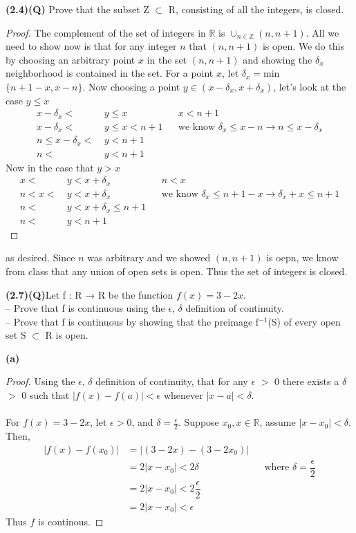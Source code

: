 \documentclass[12pt]{article}
\newcommand      {\Zm}         {{\mathbb Z}}
\newcommand      {\Rm}         {{\mathbb R}}
\begin{document}
\noindent \textbf{(2.4)(Q)} Prove that the subset Z $\subset$ R, consisting of all the integers, is closed.
\begin{proof}
    The complement of the set of integers in $\Rm$ is $\cup_{n\in\Zm}(n,n+1)$. All we need to show now is that for any integer $n$ that $(n,n+1)$ is open. We do this by choosing an arbitrary point $x$ in the set $(n,n+1)$ and showing the $\delta_x$ neighborhood is contained in the set. 
    For a point $x$, let $\delta_x = $min$\{n+1-x,x-n\}$. Now choosing a point $y\in (x-\delta_x, x + \delta_x)$, let's look at the case $y \leq x$
    \begin{align*}
        x-\delta_x <\ &y \leq x && x < n+1 \\
        x -\delta_x <\ &y \leq x < n+1 && \text{we know $\delta_x \leq x -n \rightarrow n \leq x-\delta_x$} \\
        n \leq x-\delta_x <\ &y < n+1 \\
        n <\ &y < n+1
    \end{align*}  
    Now in the case that $y > x$
    \begin{align*}
        x <\ &y < x + \delta_x && n < x \\
        n < x <\ &y < x+\delta_x && \text{we know $\delta_x \leq n+1-x \rightarrow \delta_x +x \leq n+1$} \\
        n <\ &y < x+\delta_x \leq n+1 \\
        n <\ &y < n+1
    \end{align*}
\end{proof}
as desired. Since $n$ was arbitrary and we showed $(n,n+1)$ is oepn, we know from class that any union of open sets is open. Thus the set of integers is closed. 

\begin{flushleft}
    \textbf{(2.7)(Q)}Let f : R → R be the function $f(x)=3 - 2x.$ \\
    – Prove that f is continuous using the $\epsilon$, $\delta$ definition of continuity. \\
    – Prove that f is continuous by showing that the preimage f$^{-1}$(S)
    of every open set S $\subset$ R is open.
    \end{flushleft}
    \textbf{(a)}\begin{proof}Using the $\epsilon$, $\delta$ definition of continuity, 
    that for any $\epsilon$ $>$ 0 there exists a  $\delta$ $>$ 0 such that $| f(x) - f(a) | < \epsilon$ whenever $|x - a | <  \delta$. 
    \\ \\ For $f(x)=3-2x$, let $ \epsilon > 0 $, and $\delta =  \frac{\epsilon}{2}$. Suppose $x_0, x\in \Rm$, 
    assume $| x-x_0 |< \delta$. Then, 
    \begin{align*}
        |f(x)-f(x_0)| &= |(3-2x)-(3-2x_0)| \\
        &= 2|x-x_0| < 2\delta && \text{where $\delta = \dfrac{\epsilon}{2}$} \\
        &= 2|x-x_0| < 2\dfrac{\epsilon}{2} \\
        &= 2|x-x_0| < \epsilon
    \end{align*}
    Thus $f$ is continous.    
\end{proof}
    
\end{document}
